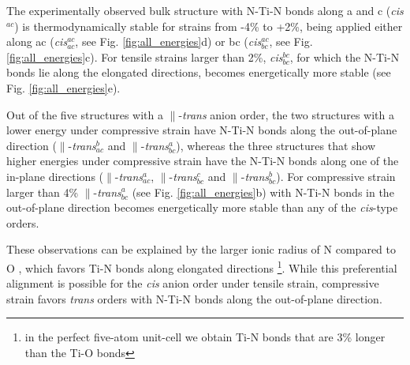 \documentclass[prl,reprint,aps,twocolumn]{revtex4-1}
\begin{document}
The experimentally observed bulk structure with N-Ti-N bonds along a and c (\textit{cis}$^{ac}$) is thermodynamically stable for strains from -4\% to +2\%, 
being applied either along ac (\textit{cis}$^{ac}_{ac}$, see Fig. \ref{fig:all_energies}d) or bc (\textit{cis}$^{ac}_{bc}$, see Fig. \ref{fig:all_energies}c).  
For tensile strains larger than 2\%, \textit{cis}$^{bc}_{bc}$, for which the N-Ti-N bonds lie along the elongated directions, becomes energetically 
more stable (see Fig. \ref{fig:all_energies}e).

Out of the five structures with a $\parallel$-\textit{trans} anion order, the two structures with a lower energy under compressive strain have N-Ti-N bonds along the out-of-plane direction ($\parallel$-\textit{trans}$_{ac}^{b}$ and $\parallel$-\textit{trans}$_{bc}^{a}$), 
whereas the three structures that show higher energies under compressive strain have the N-Ti-N bonds along one of the in-plane directions ($\parallel$-\textit{trans}$_{ac}^{a}$, $\parallel$-\textit{trans}$_{bc}^{c}$ and $\parallel$-\textit{trans}$_{bc}^{b}$). 
For compressive strain larger than 4\% $\parallel$-\textit{trans}$_{bc}^{a}$ (see Fig. \ref{fig:all_energies}b) with N-Ti-N bonds in 
the out-of-plane direction becomes energetically more stable than any of the \textit{cis}-type orders.

These observations can be explained by the larger ionic radius of N compared to O \cite{Shannon:1976vx}, 
which favors Ti-N bonds along elongated directions \footnote{in the perfect five-atom unit-cell we obtain Ti-N bonds that are 3\% longer than the Ti-O bonds}.
While this preferential alignment is possible for the \textit{cis} anion order under tensile strain, compressive strain favors \textit{trans} orders with N-Ti-N bonds along the out-of-plane direction.
\end{document}
